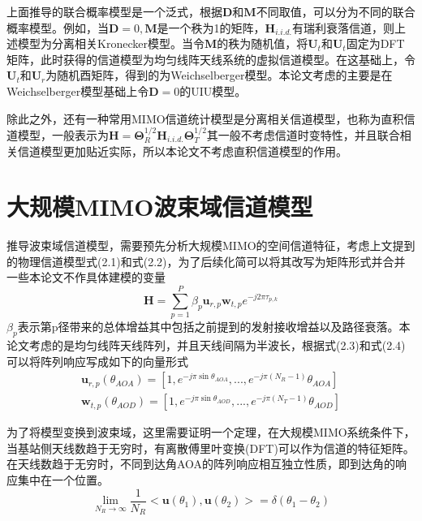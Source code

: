 \documentclass[bachelor,nocolorlinks, printoneside]{seuthesis} %
\begin{document}
\begin{Main}
上面推导的联合概率模型是一个泛式，根据$ \mathbf{D}$和$\mathbf{M}$不同取值，可以分为不同的联合概率模型。例如，当$\mathbf{D}=0,\mathbf{M}$是一个秩为1的矩阵，$\mathbf{H}_{i.i.d.}$有瑞利衰落信道，则上述模型为分离相关Kronecker模型。当令$\mathbf{M}$的秩为随机值，将$\mathbf{U}_t$和$\mathbf{U}_t$固定为DFT矩阵，此时获得的信道模型为均匀线阵天线系统的虚拟信道模型。在这基础上，令$\mathbf{U}_t$和$\mathbf{U}_r$为随机酉矩阵，得到的为Weichselberger模型。本论文考虑的主要是在Weichselberger模型基础上令$ \mathbf{D} = 0 $的UIU模型。

除此之外，还有一种常用MIMO信道统计模型是分离相关信道模型，也称为直积信道模型，一般表示为$ \mathbf{H} = \bm{\Theta}_R^{1/2} \mathbf{H}_{i.i.d.} \bm{\Theta}_T^{1/2}$其一般不考虑信道时变特性，并且联合相关信道模型更加贴近实际，所以本论文不考虑直积信道模型的作用。

\section{大规模MIMO波束域信道模型}
推导波束域信道模型，需要预先分析大规模MIMO的空间信道特征，考虑上文提到的物理信道模型式(2.1)和式(2.2)，为了后续化简可以将其改写为矩阵形式并合并一些本论文不作具体建模的变量
\begin{equation}\label{key}
\mathbf{H} = \sum_{p=1}^{P}\beta_p \mathbf{u}_{r,p}\mathbf{w}_{t,p}e^{-j2\pi \tau_{p,k}}
\end{equation}
$\beta_p$表示第p径带来的总体增益其中包括之前提到的发射接收增益以及路径衰落。本论文考虑的是均匀线阵天线阵列，并且天线间隔为半波长，根据式(2.3)和式(2.4)可以将阵列响应写成如下的向量形式
\begin{eqnarray}\label{key}
\mathbf{u}_{r,p}(\theta_{AOA}) = [1,e^{-j\pi \sin \theta_{AOA}},...,e^{-j\pi (N_R-1)}\theta_{AOA}] \\
\mathbf{w}_{t,p}(\theta_{AOD}) = [1,e^{-j\pi \sin \theta_{AOD}},...,e^{-j\pi (N_T-1)}\theta_{AOD}]
\end{eqnarray}

为了将模型变换到波束域，这里需要证明一个定理，在大规模MIMO系统条件下，当基站侧天线数趋于无穷时，有离散傅里叶变换(DFT)可以作为信道的特征矩阵。在天线数趋于无穷时，不同到达角AOA的阵列响应相互独立性质，即到达角的响应集中在一个位置。
\begin{equation}\label{key}
\lim_{N_R \rightarrow \infty}\frac{1}{N_R}<\mathbf{u}(\theta_1),\mathbf{u}(\theta_2)> = \delta(\theta_1 -\theta_2)
\end{equation}


\end{Main}
\end{document}
